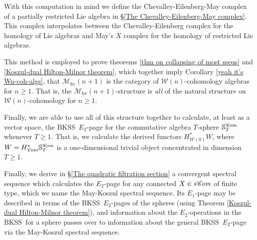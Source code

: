\documentclass[11pt]{amsart} \renewcommand{\baselinestretch}{1.2}
\theoremstyle{plain}
\numberwithin{equation}{section} %
\theoremstyle{plain}
\numberwithin{equation}{chapter} %
\newcommand{\scrC}{\mathscr{C}}
\newcommand{\calW}{\mathcal{W}}
\newcommand{\calw}{\mathcal{W}}
\newcommand{\calu}{\mathcal{U}}
\newcommand{\calMhv}{\mathcal{M}_\mathrm{hv}}
\newcommand{\algs}{{\scrC\!\textit{\normalfont\textit{om}}}}
\newcommand{\BKSS}{BKSS}
\begin{document}
\begin{Introduction}
With this computation in mind we define the Chevalley-Eilenberg-May complex of a partially restricted Lie algebra in \S\ref{The Chevalley-Eilenberg-May complex}. This complex interpolates between the Chevalley-Eilenberg complex for the homology of Lie algebras and May's $\overline{X}$ complex \cite{MayRestLie.pdf} for the homology of restricted Lie algebras.

This method is employed to prove theorems \ref{thm on collapsing of most sseqs} and \ref{Koszul-dual Hilton-Milnor theorem}, which together imply Corollary \ref{yeah it's Wn-coh-algs}, that $\calMhv(n+1)$ is the category of $\calw(n)$-cohomology algebras for $n\geq1$. That is, the $\calMhv(n+1)$-structure is \emph{all} of the natural structure on $\calW(n)$-cohomology for $n\geq1$.

Finally, we are able to use all of this structure together to calculate, at least as a vector space, the \BKSS\ $E_2$-page for the commutative algebra $T$-sphere $\mathbb{S}^{\algs}_T$ whenever $T\geq1$. That is, we calculate the derived functors $H^*_{\calw(0)}W$, where $W=H^*_{\algs}\mathbb{S}^{\algs}_T$ is a one-dimensional trivial object concentrated in dimension $T\geq1$.

Finally, we derive in \S\ref{The quadratic filtration section} a convergent spectral sequence which calculates the $E_2$-page for any connected $X\in s\algs$ of finite type, which we name the May-Koszul spectral sequence. Its $E_1$-page may be described in terms of the \BKSS\ $E_2$-pages of the spheres (using Theorem \ref{Koszul-dual Hilton-Milnor theorem}), and information about the $E_2$-operations in the \BKSS\ for a sphere passes over to information about the general \BKSS\ $E_2$-page via the May-Koszul spectral sequence.



\end{Introduction}
\end{document}
